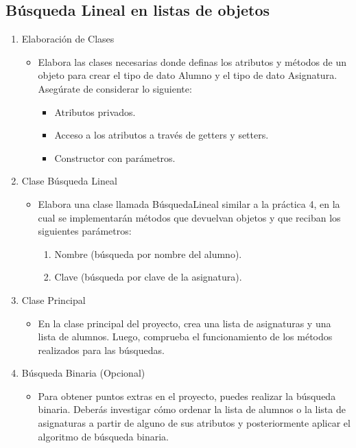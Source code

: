 \documentclass{report}
\begin{document}
\subsection*{Búsqueda Lineal en listas de objetos}
\begin{enumerate}
    \item Elaboración de Clases
    \begin{itemize}
        \item Elabora las clases necesarias donde definas los atributos y métodos de un objeto para crear el tipo de dato Alumno y el tipo de dato Asignatura. Asegúrate de considerar lo siguiente:
        \begin{itemize}
            \item Atributos privados.
            \item Acceso a los atributos a través de getters y setters.
            \item Constructor con parámetros.
        \end{itemize}
    \end{itemize}

    \item Clase Búsqueda Lineal
    \begin{itemize}
        \item Elabora una clase llamada BúsquedaLineal similar a la práctica 4, en la cual se implementarán métodos que devuelvan objetos y que reciban los siguientes parámetros:
        \begin{enumerate}
            \item Nombre (búsqueda por nombre del alumno).
            \item Clave (búsqueda por clave de la asignatura).
        \end{enumerate}
    \end{itemize}

    \item Clase Principal
    \begin{itemize}
        \item En la clase principal del proyecto, crea una lista de asignaturas y una lista de alumnos. Luego, comprueba el funcionamiento de los métodos realizados para las búsquedas.
    \end{itemize}

    \item Búsqueda Binaria (Opcional)
    \begin{itemize}
        \item Para obtener puntos extras en el proyecto, puedes realizar la búsqueda binaria. Deberás investigar cómo ordenar la lista de alumnos o la lista de asignaturas a partir de alguno de sus atributos y posteriormente aplicar el algoritmo de búsqueda binaria.
    \end{itemize}
\end{enumerate}
\end{document}
